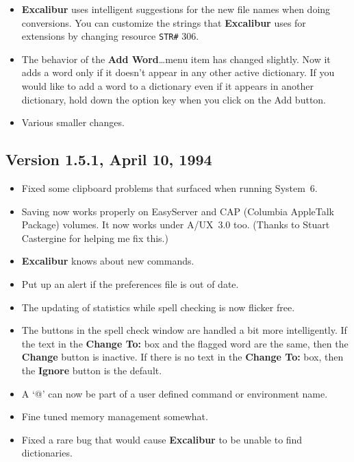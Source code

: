 ﻿\documentclass[11pt,titlepage]{article}
\newcommand{\ex}{\textbf{Excalibur}}
\begin{document}
\begin{itemize}
\item \ex{} uses intelligent suggestions for the new file names when
  doing conversions.  You can customize the strings that \ex{} uses
  for extensions by changing resource \verb+STR#+ 306.

\item The behavior of the \textbf{Add Word}\ldots menu item has
  changed slightly.  Now it adds a word only if it doesn't appear in
  any other active dictionary.  If you would like to add a word to a
  dictionary even if it appears in another dictionary, hold down the
  option key when you click on the Add button.

\item Various smaller changes.

\end{itemize}

\subsection{Version 1.5.1, April 10, 1994}

\begin{itemize}

\item Fixed some clipboard problems that surfaced when running
  System~6.

\item Saving now works properly on EasyServer and CAP (Columbia
  AppleTalk Package) volumes.  It now works under A/UX~3.0 too.
  (Thanks to Stuart Castergine for helping me fix this.)

\item \ex{} knows about new \LaTeXe{} commands.

\item Put up an alert if the preferences file is out of date.

\item The updating of statistics while spell checking is now flicker
  free.

\item The buttons in the spell check window are handled a bit more
  intelligently. If the text in the \textbf{Change To:} box and the
  flagged word are the same, then the \textbf{Change} button is
  inactive.  If there is no text in the \textbf{Change To:} box, then
  the \textbf{Ignore} button is the default.

\item A `@' can now be part of a user defined command or environment
  name.

\item Fine tuned memory management somewhat.

\item Fixed a rare bug that would cause \ex{} to be unable to find
  dictionaries.

\end{itemize}
\end{document}
